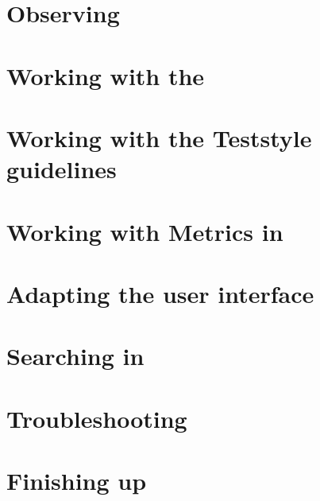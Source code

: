 \clearpage

\section{Observing \gdcases} 



\clearpage 

\section{Working with the \gdprobview}

\clearpage
\section{Working with the Teststyle guidelines}

\clearpage
\section{Working with Metrics in \app{}}


\clearpage

\section{Adapting the user interface}

\clearpage

\section{Searching in \app{}}

\clearpage

%

\section{Troubleshooting}


\clearpage

\section{Finishing up}


